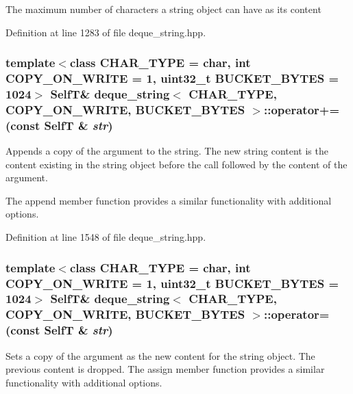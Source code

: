The maximum number of characters a string object can have as its content 

Definition at line 1283 of file deque\_\-string.hpp.\hypertarget{classdeque__string_be047cca197538745a78f73347fbdfb1}{
\subsubsection[{operator+=}]{\setlength{\rightskip}{0pt plus 5cm}template$<$class CHAR\_\-TYPE  = char, int COPY\_\-ON\_\-WRITE = 1, uint32\_\-t BUCKET\_\-BYTES = 1024$>$ {\bf SelfT}\& {\bf deque\_\-string}$<$ CHAR\_\-TYPE, COPY\_\-ON\_\-WRITE, BUCKET\_\-BYTES $>$::operator+= (const {\bf SelfT} \& {\em str})}}
\label{classdeque__string_be047cca197538745a78f73347fbdfb1}


Appends a copy of the argument to the string. The new string content is the content existing in the string object before the call followed by the content of the argument.

The append member function provides a similar functionality with additional options. 

Definition at line 1548 of file deque\_\-string.hpp.\hypertarget{classdeque__string_dc6562d086b15033ba12303fbe9bc634}{
\subsubsection[{operator=}]{\setlength{\rightskip}{0pt plus 5cm}template$<$class CHAR\_\-TYPE  = char, int COPY\_\-ON\_\-WRITE = 1, uint32\_\-t BUCKET\_\-BYTES = 1024$>$ {\bf SelfT}\& {\bf deque\_\-string}$<$ CHAR\_\-TYPE, COPY\_\-ON\_\-WRITE, BUCKET\_\-BYTES $>$::operator= (const {\bf SelfT} \& {\em str})}}
\label{classdeque__string_dc6562d086b15033ba12303fbe9bc634}


Sets a copy of the argument as the new content for the string object. The previous content is dropped. The assign member function provides a similar functionality with additional options. 


